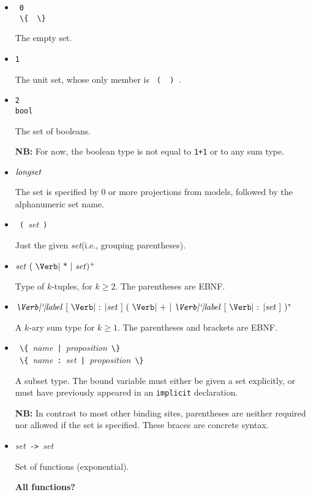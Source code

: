 \documentclass{article}
\newcommand{\keywd}[1]{\mbox{\texttt{#1}}\xspace}
\newcommand{\IMPLICIT}{\keywd{implicit}}
\newcommand{\metav}[1]{\mbox{\textit{#1}}\xspace}
\newcommand{\Ident}{\metav{name}}
\newcommand{\Label}{\metav{\Verb|`|label}}
\newcommand{\Setexp}{\metav{set}}
\newcommand{\Proposition}{\metav{proposition}}
\newcommand{\ARROW}{\mbox{\Verb| -> |}}
\newcommand{\BAR}{\mbox{\Verb+ | +}}
\newcommand{\COLON}{\mbox{\Verb| : |}}
\newcommand{\LBRACE}{\mbox{\Verb| \{ |}}
\newcommand{\LPAREN}{\mbox{\Verb| ( |}}
\newcommand{\PLUS}{\mbox{\Verb| + |}}
\newcommand{\RBRACE}{\mbox{\Verb| \} |}}
\newcommand{\RPAREN}{\mbox{\Verb| ) |}}
\newcommand{\TIMES}{\mbox{\Verb| * |}}
\newcommand{\NB}{\textbf{NB: }}
\begin{document}
\begin{itemize}
\item \ \keywd{0}\\
      \LBRACE\RBRACE

  The empty set.

\item \keywd{1}

  The unit set, whose only member is \LPAREN\RPAREN.

\item \keywd{2}\\
      \keywd{bool}

  The set of booleans.  

  \NB For now, the boolean type is not equal to 
  \Verb|1+1| or to any sum type.

\item $\metav{longset}$
  
  The set is specified by 0 or more projections from models, followed
  by the alphanumeric set name.

\item \LPAREN \Setexp \RPAREN

  Just the given \Setexp (i.e., grouping parentheses).

\item $\Setexp\ (\ \TIMES\ \Setexp )^{+}$

  Type of $k$-tuples, for $k\ge 2$.  The parentheses are EBNF.

\item $\Label\ [\ \COLON \Setexp\ ]\ (\ \PLUS\ \Label\ [\ \COLON \Setexp\ ]\ )^{*}$

  A $k$-ary sum type for $k\ge 1$.  The parentheses and brackets
  are EBNF.

\item \LBRACE \Ident \BAR \Proposition \RBRACE\\
      \LBRACE \Ident \COLON \Setexp \BAR \Proposition \RBRACE
      
      A subset type.  The bound variable must either be given a set
      explicitly, or must have previously appeared in an \IMPLICIT
      declaration.

  \NB In contrast to most other binding sites, parentheses are neither
  required nor allowed if the set is specified.  These braces are
  concrete syntax.

\item \Setexp \ARROW \Setexp

  Set of functions (exponential).

  \textbf{All functions?}


\end{itemize}
\end{document}
